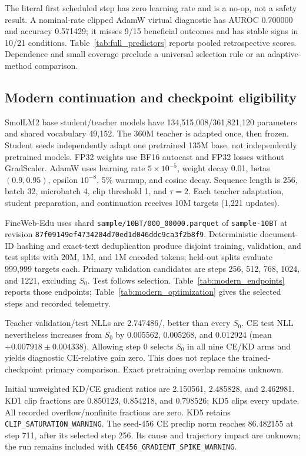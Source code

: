 The literal first scheduled step has zero learning rate and is a no-op, not a safety result. A nominal-rate clipped AdamW virtual diagnostic has AUROC 0.700000 and accuracy 0.571429; it misses 9/15 beneficial outcomes and has stable signs in 10/21 conditions. Table~\ref{tab:full_predictors} reports pooled retrospective scores. Dependence and small coverage preclude a universal selection rule or an adaptive-method comparison.


\subsection{Modern continuation and checkpoint eligibility}
SmolLM2 base student/teacher models have 134,515,008/361,821,120 parameters and shared vocabulary 49,152. The 360M teacher is adapted once, then frozen. Student seeds independently adapt one pretrained 135M base, not independently pretrained models. FP32 weights use BF16 autocast and FP32 losses without GradScaler. AdamW uses learning rate $5\times10^{-5}$, weight decay 0.01, betas $(0.9,0.95)$, epsilon $10^{-8}$, 5\% warmup, and cosine decay. Sequence length is 256, batch 32, microbatch 4, clip threshold 1, and $\tau=2$. Each teacher adaptation, student preparation, and continuation receives 10M targets (1,221 updates).

FineWeb-Edu uses shard \texttt{sample/10BT/000\_00000.parquet} of \texttt{sample-10BT} at revision \texttt{87f09149ef4734204d70e}\allowbreak\texttt{d1d046ddc9ca3f2b8f9}. Deterministic document-ID hashing and exact-text deduplication produce disjoint training, validation, and test splits with 20M, 1M, and 1M encoded tokens; held-out splits evaluate 999,999 targets each. Primary validation candidates are steps 256, 512, 768, 1024, and 1221, excluding $S_0$. Test follows selection. Table~\ref{tab:modern_endpoints} reports those endpoints; Table~\ref{tab:modern_optimization} gives the selected steps and recorded telemetry.

Teacher validation/test NLLs are 2.747486/, better than every $S_0$. CE test NLL nevertheless increases from $S_0$ by 0.005562, 0.005268, and 0.012924 (mean $+0.007918\pm0.004338$). Allowing step 0 selects $S_0$ in all nine CE/KD arms and yields diagnostic CE-relative gain zero. This does not replace the trained-checkpoint primary comparison. Exact pretraining overlap remains unknown.



Initial unweighted KD/CE gradient ratios are 2.150561, 2.485828, and 2.462981. KD1 clip fractions are 0.850123, 0.854218, and 0.798526; KD5 clips every update. All recorded overflow/nonfinite fractions are zero. KD5 retains \texttt{CLIP\_SATURATION\_WARNING}. The seed-456 CE preclip norm reaches 86.482155 at step 711, after its selected step 256. Its cause and trajectory impact are unknown; the run remains included with \texttt{CE456\_GRADIENT\_SPIKE\_WARNING}.

